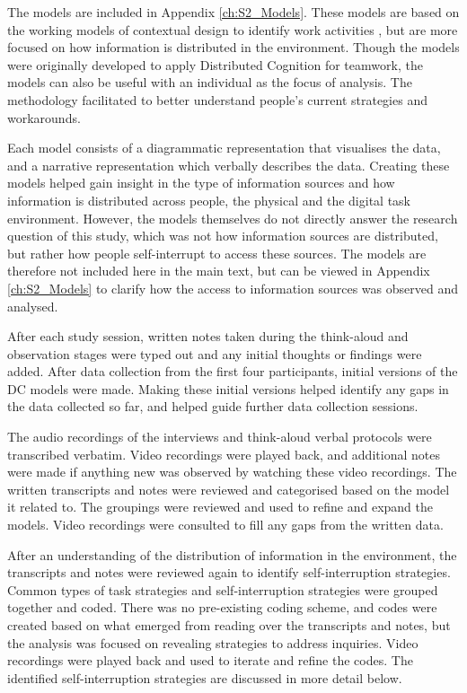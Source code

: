 The models are included in Appendix \ref{ch:S2_Models}. These models are based on the working models of contextual design to identify work activities \citep{Holtzblatt2014}, but are more focused on how information is distributed in the environment. Though the models were originally developed to apply Distributed Cognition for teamwork, the models can also be useful with an individual as the focus of analysis. The methodology facilitated to better understand people’s current strategies and workarounds.

Each model consists of a diagrammatic representation that visualises the data, and a narrative representation which verbally describes the data. Creating these models helped gain insight in the type of information sources and how information is distributed across people, the physical and the digital task environment. However, the models themselves do not directly answer the research question of this study, which was not how information sources are distributed, but rather how people self-interrupt to access these sources. The models are therefore not included here in the main text, but can be viewed in Appendix \ref{ch:S2_Models} to clarify how the access to information sources was observed and analysed.

After each study session, written notes taken during the think-aloud and observation stages were typed out and any initial thoughts or findings were added. After data collection from the first four participants, initial versions of the DC models were made. Making these initial versions helped identify any gaps in the data collected so far, and helped guide further data collection sessions. 

The audio recordings of the interviews and think-aloud verbal protocols were transcribed verbatim. Video recordings were played back, and additional notes were made if anything new was observed by watching these video recordings. The written transcripts and notes were reviewed and categorised based on the model it related to. The groupings were reviewed and used to refine and expand the models. Video recordings were consulted to fill any gaps from the written data.


After an understanding of the distribution of information in the environment, the transcripts and notes were reviewed again to identify self-interruption strategies. Common types of task strategies and self-interruption strategies were grouped together and coded. There was no pre-existing coding scheme, and codes were created based on what emerged from reading over the transcripts and notes, but the analysis was focused on revealing strategies to address inquiries. Video recordings were played back and used to iterate and refine the codes. The identified self-interruption strategies are discussed in more detail below. 

